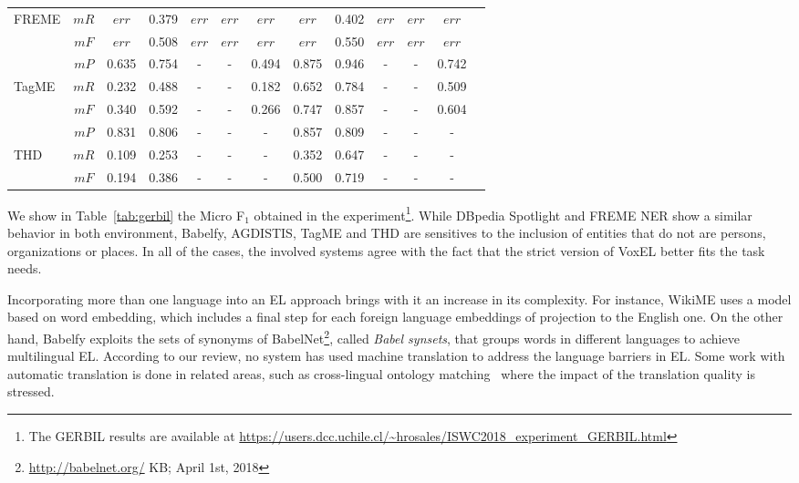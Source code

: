 \documentclass{llncs}
\begin{document}
\begin{table}[tb!]
\begin{tabular}{@{}lcccccccccccc@{}}
FREME       &$mR$& $err$& 0.379 & $err$ & $err$ & $err$ & $err$ & 0.402 & $err$ & $err$ & $err$  \\
            &$mF$& $err$& 0.508 & $err$ & $err$ & $err$ & $err$ & 0.550 & $err$ & $err$ & $err$ \\\midrule
            &$mP$& 0.635& 0.754 & -     & -     & 0.494 & 0.875 & 0.946 & -     & -     & 0.742  \\
TagME       &$mR$& 0.232& 0.488 & -     & -     & 0.182 & 0.652 & 0.784 & -     & -     & 0.509  \\
            &$mF$& 0.340& 0.592 & -     & -     & 0.266 & 0.747 & 0.857 & -     & -     & 0.604 \\\midrule
            &$mP$& 0.831& 0.806 & -     & -     & -     & 0.857 & 0.809 & -     & -     & -     \\
THD         &$mR$& 0.109& 0.253 & -     & -     & -     & 0.352 & 0.647 & -     & -     & -     \\
            &$mF$& 0.194& 0.386 & -     & -     & -     & 0.500 & 0.719 & -     & -     & -    \\\bottomrule 
            
\end{tabular}
\end{table}

We show in Table~\ref{tab:gerbil} the Micro F$_1$ obtained in the experiment\footnote{The GERBIL results are available at \url{https://users.dcc.uchile.cl/~hrosales/ISWC2018_experiment_GERBIL.html}}. While DBpedia Spotlight and FREME NER show a similar behavior in both environment, Babelfy, AGDISTIS, TagME and THD are sensitives to the inclusion of entities that do not are persons, organizations or places. In all of the cases, the involved systems agree with the fact that the strict version of VoxEL better fits the task needs. 

Incorporating more than one language into an EL approach brings with it an increase in its complexity. For instance, WikiME uses a model based on word embedding, which includes a final step for each foreign language embeddings of projection to the English one. On the other hand, Babelfy exploits the sets of synonyms of BabelNet\footnote{\url{http://babelnet.org/} KB; April 1st, 2018}, called \textit{Babel synsets}, that groups words in different languages to achieve multilingual EL. According to our review, no system has used machine translation to address the language barriers in EL. Some work with automatic translation is done in related areas, such as cross-lingual ontology matching~\cite{fu2010} where the impact of the translation quality is stressed.
\end{document}
